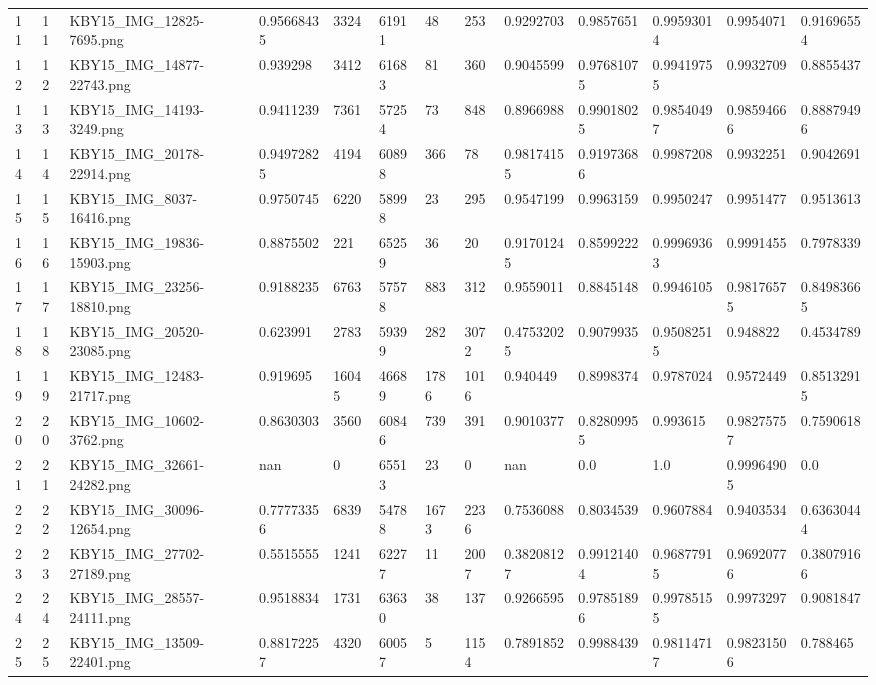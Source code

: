 \documentclass[11pt, a4paper, twoside]{report}
\begin{document}
\begin{longtable}[c]{@{}lllllllllllll@{}}
11 & 11 & KBY15\_IMG\_12825-7695.png & 0.95668435 & 3324 & 61911 & 48 & 253 & 0.9292703 & 0.9857651 & 0.99593014 & 0.9954071 & 0.91696554 \\
12 & 12 & KBY15\_IMG\_14877-22743.png & 0.939298 & 3412 & 61683 & 81 & 360 & 0.9045599 & 0.97681075 & 0.99419755 & 0.9932709 & 0.8855437 \\
13 & 13 & KBY15\_IMG\_14193-3249.png & 0.9411239 & 7361 & 57254 & 73 & 848 & 0.8966988 & 0.99018025 & 0.98540497 & 0.98594666 & 0.88879496 \\
14 & 14 & KBY15\_IMG\_20178-22914.png & 0.94972825 & 4194 & 60898 & 366 & 78 & 0.98174155 & 0.91973686 & 0.9987208 & 0.9932251 & 0.9042691 \\
15 & 15 & KBY15\_IMG\_8037-16416.png & 0.9750745 & 6220 & 58998 & 23 & 295 & 0.9547199 & 0.9963159 & 0.9950247 & 0.9951477 & 0.9513613 \\
16 & 16 & KBY15\_IMG\_19836-15903.png & 0.8875502 & 221 & 65259 & 36 & 20 & 0.91701245 & 0.8599222 & 0.99969363 & 0.9991455 & 0.7978339 \\
17 & 17 & KBY15\_IMG\_23256-18810.png & 0.9188235 & 6763 & 57578 & 883 & 312 & 0.9559011 & 0.8845148 & 0.9946105 & 0.98176575 & 0.84983665 \\
18 & 18 & KBY15\_IMG\_20520-23085.png & 0.623991 & 2783 & 59399 & 282 & 3072 & 0.47532025 & 0.9079935 & 0.95082515 & 0.948822 & 0.4534789 \\
19 & 19 & KBY15\_IMG\_12483-21717.png & 0.919695 & 16045 & 46689 & 1786 & 1016 & 0.940449 & 0.8998374 & 0.9787024 & 0.9572449 & 0.85132915 \\
20 & 20 & KBY15\_IMG\_10602-3762.png & 0.8630303 & 3560 & 60846 & 739 & 391 & 0.9010377 & 0.82809955 & 0.993615 & 0.98275757 & 0.7590618 \\
21 & 21 & KBY15\_IMG\_32661-24282.png & nan & 0 & 65513 & 23 & 0 & nan & 0.0 & 1.0 & 0.99964905 & 0.0 \\
22 & 22 & KBY15\_IMG\_30096-12654.png & 0.77773356 & 6839 & 54788 & 1673 & 2236 & 0.7536088 & 0.8034539 & 0.9607884 & 0.9403534 & 0.63630444 \\
23 & 23 & KBY15\_IMG\_27702-27189.png & 0.5515555 & 1241 & 62277 & 11 & 2007 & 0.38208127 & 0.99121404 & 0.96877915 & 0.96920776 & 0.38079166 \\
24 & 24 & KBY15\_IMG\_28557-24111.png & 0.9518834 & 1731 & 63630 & 38 & 137 & 0.9266595 & 0.97851896 & 0.99785155 & 0.9973297 & 0.9081847 \\
25 & 25 & KBY15\_IMG\_13509-22401.png & 0.88172257 & 4320 & 60057 & 5 & 1154 & 0.7891852 & 0.9988439 & 0.98114717 & 0.98231506 & 0.788465 \\

\end{longtable}
\end{document}
